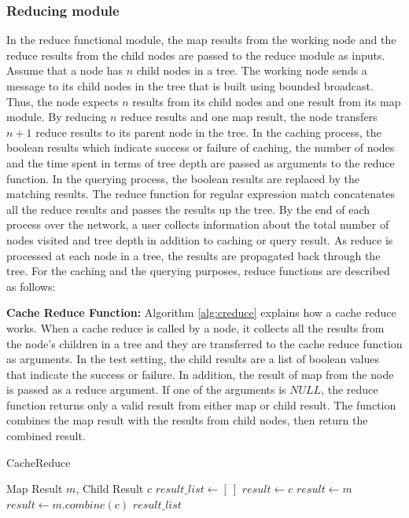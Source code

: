 \documentclass[9.5pt,journal,final,finalsubmission,twocolumn]{IEEEtran}
\begin{document}
\subsubsection{Reducing module}
In the reduce functional module, the map results from the working node and 
the reduce results from the child nodes are passed to the reduce 
module as inputs. Assume that a node has $n$ child nodes in a tree.
The working node sends a message to its child nodes in the tree that 
is built using bounded broadcast. Thus, the node expects 
$n$ results from its child nodes and one result from its map module.
By reducing $n$ reduce results and one map result, the node 
transfers $n+1$ reduce results to its parent node in the tree.
In the caching process, the boolean results which indicate success or 
failure
of caching, the number of nodes and the time spent in terms of tree 
depth are passed as arguments to the reduce function. 
In the querying process, the boolean results are replaced by 
the matching results. 
The reduce function for regular expression match concatenates 
all the reduce results and passes the results up the tree.
By the end of each process over the network, a user collects information 
about the total number of nodes visited and tree depth 
in addition to caching or query result.
As reduce is processed at each node in a tree, the results are propagated 
back through the tree. 
For the caching and the querying purposes, reduce functions are
described as follows:

\textbf{Cache Reduce Function:} Algorithm \ref{alg:creduce} explains
how a cache reduce works. When a cache reduce is called by a node, 
it collects all the results from the node's children in a tree and 
they are transferred to the cache reduce function as arguments. 
In the test setting, the child results are a list of boolean values
that indicate the success or failure.
In addition,
the result of map from the node is passed as a reduce argument.
If one of the arguments is $NULL$, the reduce function returns
only a valid result from either map or child result.
The function combines the map result with the results from child nodes,
then return the combined result.
\begin{algorithm}
\caption{CacheReduce}
\label{alg:creduce}
\begin{algorithmic}[1]
\REQUIRE Map Result $m$,  
\REQUIRE Child Result $c$ 
\STATE $result\_list \leftarrow [~]$
  \STATE $result \leftarrow c$
  \STATE $result \leftarrow m$
\ELSE
  \STATE $result \leftarrow m.combine(c)$
\ENDIF
\RETURN $result\_list$
\end{algorithmic}
\end{algorithm}
\end{document}
